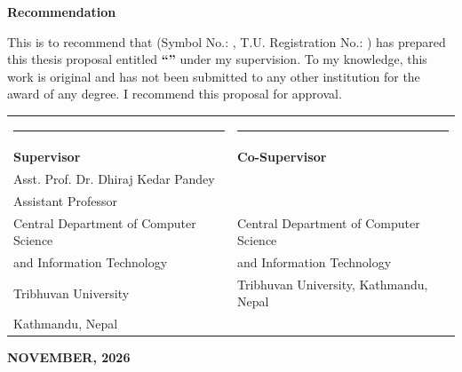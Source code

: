 
\clearpage
{}
{}

\begin{center}
{\fontsize{16}{20}\selectfont \textbf{Recommendation}}
\end{center}

\vspace{0.5cm}

\noindent
This is to recommend that \textbf{\authorname} (Symbol No.: \studentroll, T.U. Registration No.: \turegdno) has prepared this thesis proposal entitled \textbf{``\thesistitle''} under my supervision. To my knowledge, this work is original and has not been submitted to any other institution for the award of any degree. I recommend this proposal for approval.

\vspace{2.5cm}

\noindent
\begin{tabular}{@{}p{7.5cm}p{7.5cm}@{}}
\rule{6cm}{0.4pt} & \rule{6cm}{0.4pt} \\
\textbf{Supervisor} & \textbf{Co-Supervisor} \\
Asst. Prof. Dr. Dhiraj Kedar Pandey &  \\
Assistant Professor &  \\
Central Department of Computer Science & Central Department of Computer Science \\
and Information Technology & and Information Technology \\
Tribhuvan University & Tribhuvan University, Kathmandu, Nepal \\
Kathmandu, Nepal & \\
\end{tabular}

\vspace{1.5cm}

\begin{center}
{\fontsize{12}{15}\selectfont \textbf{NOVEMBER, 2026}}
\end{center}
